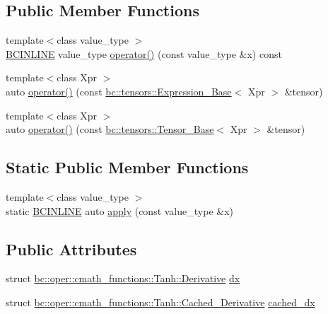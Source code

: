 \subsection*{Public Member Functions}
\begin{DoxyCompactItemize}
\item 
{\footnotesize template$<$class value\+\_\+type $>$ }\\\hyperlink{common_8h_a6699e8b0449da5c0fafb878e59c1d4b1}{B\+C\+I\+N\+L\+I\+NE} value\+\_\+type \hyperlink{structbc_1_1oper_1_1cmath__functions_1_1Tanh_a0e09b9acd40cc6dffb1a3a239d8b346b}{operator()} (const value\+\_\+type \&x) const
\item 
{\footnotesize template$<$class Xpr $>$ }\\auto \hyperlink{structbc_1_1oper_1_1cmath__functions_1_1Tanh_a093d41d00372a0983238d6192f70b338}{operator()} (const \hyperlink{classbc_1_1tensors_1_1Expression__Base}{bc\+::tensors\+::\+Expression\+\_\+\+Base}$<$ Xpr $>$ \&tensor)
\item 
{\footnotesize template$<$class Xpr $>$ }\\auto \hyperlink{structbc_1_1oper_1_1cmath__functions_1_1Tanh_abda6742289dbcd543d9a56e79c50d794}{operator()} (const \hyperlink{classbc_1_1tensors_1_1Tensor__Base}{bc\+::tensors\+::\+Tensor\+\_\+\+Base}$<$ Xpr $>$ \&tensor)
\end{DoxyCompactItemize}
\subsection*{Static Public Member Functions}
\begin{DoxyCompactItemize}
\item 
{\footnotesize template$<$class value\+\_\+type $>$ }\\static \hyperlink{common_8h_a6699e8b0449da5c0fafb878e59c1d4b1}{B\+C\+I\+N\+L\+I\+NE} auto \hyperlink{structbc_1_1oper_1_1cmath__functions_1_1Tanh_ab204c4a033f53f988ecab1ffee0b1c07}{apply} (const value\+\_\+type \&x)
\end{DoxyCompactItemize}
\subsection*{Public Attributes}
\begin{DoxyCompactItemize}
\item 
struct \hyperlink{structbc_1_1oper_1_1cmath__functions_1_1Tanh_1_1Derivative}{bc\+::oper\+::cmath\+\_\+functions\+::\+Tanh\+::\+Derivative} \hyperlink{structbc_1_1oper_1_1cmath__functions_1_1Tanh_a640cb2101c0a4f59d456b68498224db8}{dx}
\item 
struct \hyperlink{structbc_1_1oper_1_1cmath__functions_1_1Tanh_1_1Cached__Derivative}{bc\+::oper\+::cmath\+\_\+functions\+::\+Tanh\+::\+Cached\+\_\+\+Derivative} \hyperlink{structbc_1_1oper_1_1cmath__functions_1_1Tanh_af307ef995dbbe18f2d3cc0d310ae1898}{cached\+\_\+dx}
\end{DoxyCompactItemize}


